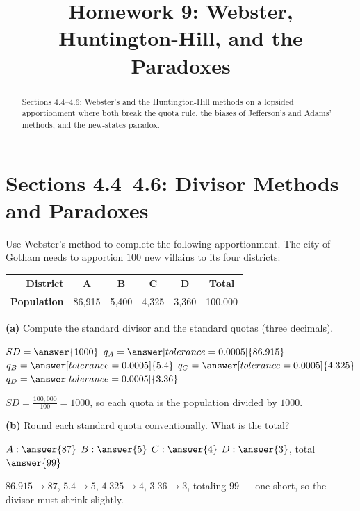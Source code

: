 \documentclass[12pt]{ximera}
\title{Homework 9: Webster, Huntington-Hill, and the Paradoxes}
\begin{document}
\begin{abstract}
Sections 4.4--4.6: Webster's and the Huntington-Hill methods on a lopsided
apportionment where both break the quota rule, the biases of Jefferson's and Adams'
methods, and the new-states paradox.
\end{abstract}
\maketitle

\section*{Sections 4.4--4.6: Divisor Methods and Paradoxes}

\begin{problem}
Use Webster's method to complete the following apportionment. The city of Gotham needs
to apportion $100$ new villains to its four districts:
\begin{center}
\begin{tabular}{|r|c|c|c|c|c|}\hline
\textbf{District} & A & B & C & D & \textbf{Total}\\\hline
\textbf{Population} & 86{,}915 & 5{,}400 & 4{,}325 & 3{,}360 & 100{,}000\\\hline
\end{tabular}
\end{center}

\begin{prompt}
\textbf{(a)} Compute the standard divisor and the standard quotas (three decimals).

$SD=\answer{1000}$ \qquad $q_A=\answer[tolerance=0.0005]{86.915}$ \quad
$q_B=\answer[tolerance=0.0005]{5.4}$ \quad $q_C=\answer[tolerance=0.0005]{4.325}$ \quad
$q_D=\answer[tolerance=0.0005]{3.36}$

\begin{feedback}
$SD=\frac{100{,}000}{100}=1000$, so each quota is the population divided by $1000$.
\end{feedback}
\end{prompt}

\begin{prompt}
\textbf{(b)} Round each standard quota conventionally. What is the total?

$A:\answer{87}$ \quad $B:\answer{5}$ \quad $C:\answer{4}$ \quad $D:\answer{3}$, \quad
total $\answer{99}$

\begin{feedback}
$86.915\to 87$, $5.4\to 5$, $4.325\to 4$, $3.36\to 3$, totaling $99$ --- one short, so
the divisor must shrink slightly.
\end{feedback}
\end{prompt}


\end{problem}
\end{document}
